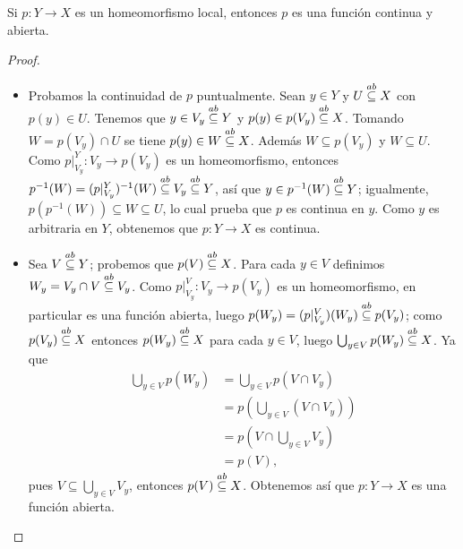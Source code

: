 \begin{Prop}
   Si $p:Y\to X$ es un homeomorfismo local, entonces $p$ es una función continua y abierta.
\end{Prop}
\begin{proof}
   \begin{itemize}
      \item Probamos la continuidad de $p$ puntualmente. Sean $y\in Y$ y $U\stackrel{ab}{\subseteq} X$ con $p(y)\in U$. Tenemos que $y\in V_y\stackrel{ab}{\subseteq} Y$ y $p(y)\in p(V_y)\stackrel{ab}{\subseteq} X$. Tomando $W=p(V_y)\cap U$ se tiene $p(y)\in W\stackrel{ab}{\subseteq} X$. Además $W\subseteq p(V_y)$ y $W\subseteq U$. Como $p|^{Y}_{V_y}:V_y\to p(V_y)$ es un homeomorfismo, entonces $p^{-1}(W)=(p|^{Y}_{V_y})^{-1}(W)\stackrel{ab}{\subseteq} V_y \stackrel{ab}{\subseteq} Y$, así que $y\in p^{-1}(W)\stackrel{ab}{\subseteq} Y$; igualmente, $p(p^{-1}(W))\subseteq W \subseteq U$, lo cual prueba que $p$ es continua en $y$. Como $y$ es arbitraria en $Y$, obtenemos que $p:Y\to X$ es continua.
      \item Sea $V\stackrel{ab}{\subseteq} Y$; probemos que $p(V)\stackrel{ab}{\subseteq} X$. Para cada $y\in V$ definimos $W_y=V_y\cap V\stackrel{ab}{\subseteq} V_y$. Como $p|^{V}_{V_y}:V_y\to p(V_y)$ es un homeomorfismo, en particular es una función abierta, luego $p(W_y)=(p|^{V}_{V_y})(W_y)\stackrel{ab}{\subseteq} p(V_y)$; como $p(V_y)\stackrel{ab}{\subseteq} X$ entonces $p(W_y)\stackrel{ab}{\subseteq} X$ para cada $y\in V$, luego $\bigcup_{y\in V} p(W_y)\stackrel{ab}{\subseteq} X$. Ya que
         $$
         \begin{aligned}
            \bigcup_{y\in V}p(W_y)&=\bigcup_{y\in V}p(V\cap V_y)\\
                                  &=p\left( \bigcup_{y\in V}(V\cap V_y)\right)\\
                                  &=p\left( V\cap\bigcup_{y\in V}V_y\right)\\
                                  &=p(V),
         \end{aligned}
         $$
         pues $V\subseteq \bigcup_{y\in V}V_y$, entonces $p(V)\stackrel{ab}{\subseteq} X$. Obtenemos así que $p:Y\to X$ es una función abierta.
   \end{itemize}
\end{proof}


            

